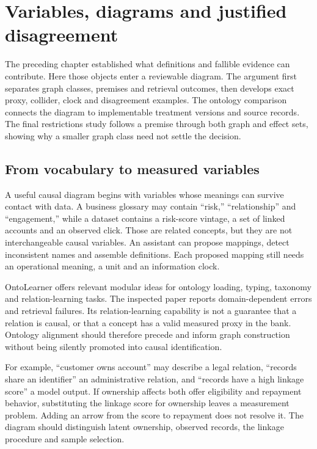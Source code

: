 \chapter{Variables, diagrams and justified disagreement}
\label{la:diagrams}

The preceding chapter established what definitions and fallible evidence can
contribute. Here those objects enter a reviewable diagram. The argument first
separates graph classes, premises and retrieval outcomes, then develops exact
proxy, collider, clock and disagreement examples. The ontology comparison
connects the diagram to implementable treatment versions and source records.
The final restrictions study follows a premise through both graph and effect
sets, showing why a smaller graph class need not settle the decision.

\section{From vocabulary to measured variables}

A useful causal diagram begins with variables whose meanings can survive
contact with data. A business glossary may contain ``risk,'' ``relationship''
and ``engagement,'' while a dataset contains a risk-score vintage, a set of
linked accounts and an observed click. Those are related concepts, but they
are not interchangeable causal variables. An assistant can propose mappings,
detect inconsistent names and assemble definitions. Each proposed mapping
still needs an operational meaning, a unit and an information clock.

OntoLearner offers relevant modular ideas for ontology loading, typing,
taxonomy and relation-learning tasks. The inspected paper reports
domain-dependent errors and retrieval failures. Its relation-learning
capability is not a guarantee that a relation is causal, or that a concept
has a valid measured proxy in the bank. Ontology alignment should therefore
precede and inform graph construction without being silently promoted into
causal identification. \citep{v12_la_2607_01977}

For example, ``customer owns account'' may describe a legal relation,
``records share an identifier'' an administrative relation, and ``records
have a high linkage score'' a model output. If ownership affects both offer
eligibility and repayment behavior, substituting the linkage score for
ownership leaves a measurement problem. Adding an arrow from the score to
repayment does not resolve it. The diagram should distinguish latent
ownership, observed records, the linkage procedure and sample selection.

